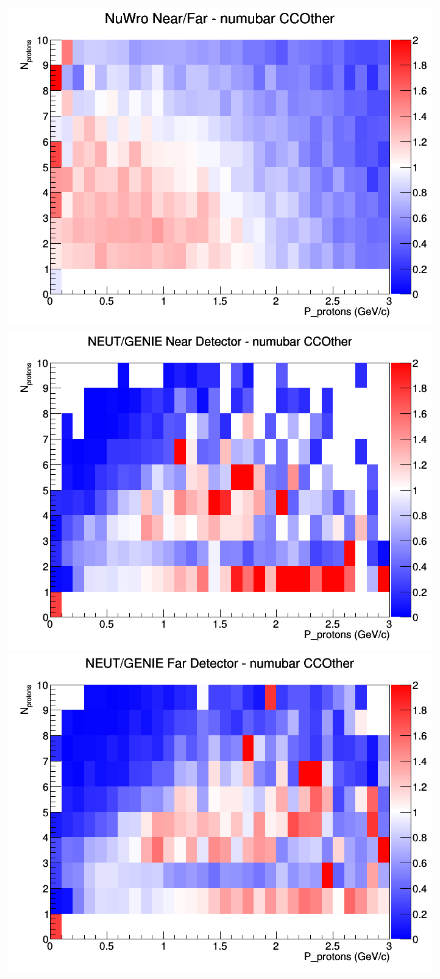 \begin{figure}[h]
\endminipage
{}
\includegraphics[width=\linewidth]{N_P/nominal/protons/ratios/CCOther_NuWro_numubar_NF_N_P.png}
\endminipage
\newline
{}
\includegraphics[width=\linewidth]{N_P/nominal/protons/ratios/CCOther_NEUT_GENIE_numubar_near_N_P.png}
\endminipage
{}
\includegraphics[width=\linewidth]{N_P/nominal/protons/ratios/CCOther_NEUT_GENIE_numubar_far_N_P.png}

\end{figure}
